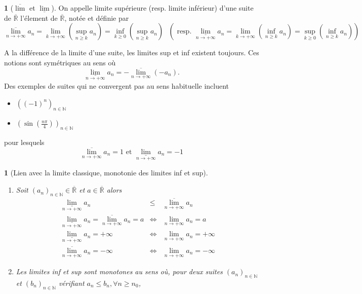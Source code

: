 \documentclass[8pt,notheorems]{beamer}
\def \N{\mathbb N}
\newcommand{\RL}{\mathbb{R}}
\newtheorem{prop}{\translate{Proposition}}
\theoremstyle{definition}
\newtheorem{definition}{\translate{Definition}}
\theoremstyle{example}
\theoremstyle{mystyle}
\theoremstyle{plain}
\begin{document}
\begin{frame}[allowframebreaks]
$$$$
\begin{definition}[$\overline{\lim}$ et $\underline{\lim}$]
On appelle limite supérieure (resp. limite inférieur) d'une suite de $\overline{\RL}$ l'élement de $\overline{\RL}$, notée et définie par
$$
\underset{n\rightarrow +\infty}{\overline{\lim}}a_n=
\underset{k\rightarrow +\infty}{\lim}\left(\underset{n\geq k}{\sup} a_n\right)= \underset{k\geq0}{\inf}\left(\underset{n\geq k}{\sup} a_n\right)
\text{ }\left(\text{ resp. }\underset{n\rightarrow +\infty}{\underline{\lim}}a_n
=\underset{k\rightarrow +\infty}{\lim}\left(\underset{n\geq k}{\inf} a_n\right) = \underset{k\geq0}{\sup}\left(\underset{n\geq k}{\inf} a_n\right) \right)
$$
\end{definition}
A la différence de la limite d'une suite, les limites sup et inf existent toujours. Ces notions sont symétriques au sens où
$$\underset{n\rightarrow+\infty}{\underline{\lim}}a_n=-\underset{n\rightarrow+\infty}{\overline{\lim}}(-a_n).$$
Des exemples de suites qui ne convergent pas au sens habituelle incluent
\begin{itemize}
\item $\left((-1)^{n}\right)_{n\in\N}$
\item $\left(\sin\left(\frac{n\pi}{4}\right)\right)_{n\in\N}$
\end{itemize}
pour lesquels
$$
\underset{n\rightarrow+\infty}{\overline{\lim}}a_n=1\text{ et }\underset{n\rightarrow+\infty}{\underline{\lim}}a_n=-1
$$
\begin{prop}[Lien avec la limite classique, monotonie des limites inf et sup]\label{prop:Monotonielimsupinf}
\begin{enumerate}
\item Soit $(a_{n})_{n\in\N}\in \overline{\RL}$ et $a\in\overline{\RL}$ alors
\begin{eqnarray*}
\underset{n\rightarrow+\infty}{\underline{\lim}}a_n&\leq& \underset{n\rightarrow+\infty}{\overline{\lim}}a_n\\
 \underset{n\rightarrow+\infty}{\underline{\lim}}a_n= \underset{n\rightarrow+\infty}{\overline{\lim}}a_n=a&\Leftrightarrow&\underset{n\rightarrow+\infty}{\lim}a_n=a\\
 \underset{n\rightarrow+\infty}{\underline{\lim}}a_n=+\infty&\Leftrightarrow& \underset{n\rightarrow+\infty}{\lim}a_n=+\infty\\
\underset{n\rightarrow+\infty}{\overline{\lim}}a_n=-\infty&\Leftrightarrow&
\underset{n\rightarrow+\infty}{\lim}a_n=-\infty
\end{eqnarray*}
\item Les limites inf et sup sont monotones au sens où, pour deux suites $(a_n)_{n\in\N}$ et $(b_n)_{n\in\N}$ vérifiant $a_n\leq b_n,\forall n\geq n_0$,

\end{enumerate}
\end{prop}
\end{frame}
\end{document}
